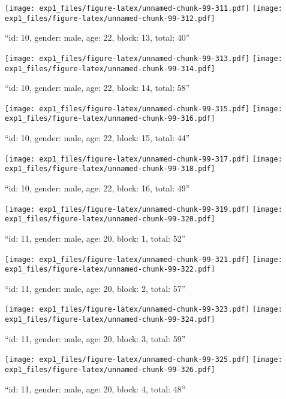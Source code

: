 \documentclass[,]{article}
\begin{document}
\texttt{[image: exp1\_files/figure-latex/unnamed-chunk-99-311.pdf]}
\texttt{[image: exp1\_files/figure-latex/unnamed-chunk-99-312.pdf]}

\newpage
[1] 

``id: 10, gender: male, age: 22, block: 13, total: 40''

\texttt{[image: exp1\_files/figure-latex/unnamed-chunk-99-313.pdf]}
\texttt{[image: exp1\_files/figure-latex/unnamed-chunk-99-314.pdf]}

\newpage
[1] 

``id: 10, gender: male, age: 22, block: 14, total: 58''

\texttt{[image: exp1\_files/figure-latex/unnamed-chunk-99-315.pdf]}
\texttt{[image: exp1\_files/figure-latex/unnamed-chunk-99-316.pdf]}

\newpage
[1] 

``id: 10, gender: male, age: 22, block: 15, total: 44''

\texttt{[image: exp1\_files/figure-latex/unnamed-chunk-99-317.pdf]}
\texttt{[image: exp1\_files/figure-latex/unnamed-chunk-99-318.pdf]}

\newpage
[1] 

``id: 10, gender: male, age: 22, block: 16, total: 49''

\texttt{[image: exp1\_files/figure-latex/unnamed-chunk-99-319.pdf]}
\texttt{[image: exp1\_files/figure-latex/unnamed-chunk-99-320.pdf]}

\newpage
[1] 

``id: 11, gender: male, age: 20, block: 1, total: 52''

\texttt{[image: exp1\_files/figure-latex/unnamed-chunk-99-321.pdf]}
\texttt{[image: exp1\_files/figure-latex/unnamed-chunk-99-322.pdf]}

\newpage
[1] 

``id: 11, gender: male, age: 20, block: 2, total: 57''

\texttt{[image: exp1\_files/figure-latex/unnamed-chunk-99-323.pdf]}
\texttt{[image: exp1\_files/figure-latex/unnamed-chunk-99-324.pdf]}

\newpage
[1] 

``id: 11, gender: male, age: 20, block: 3, total: 59''

\texttt{[image: exp1\_files/figure-latex/unnamed-chunk-99-325.pdf]}
\texttt{[image: exp1\_files/figure-latex/unnamed-chunk-99-326.pdf]}

\newpage
[1] 

``id: 11, gender: male, age: 20, block: 4, total: 48''
\end{document}
